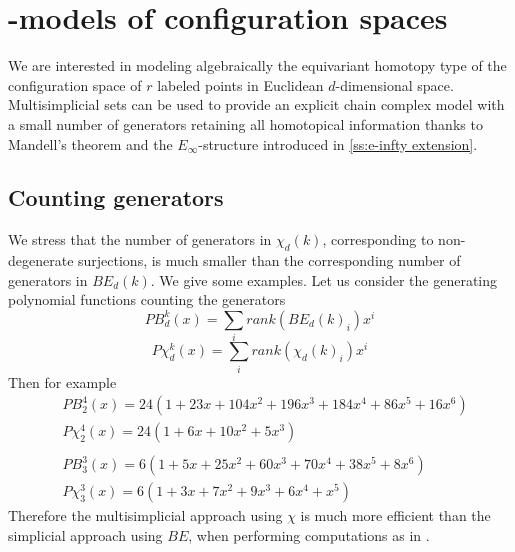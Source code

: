 
\section{\pdfEinfty-models of configuration spaces}

We are interested in modeling algebraically the equivariant homotopy type of the configuration space of $r$ labeled points in Euclidean $d$-dimensional space.
Multisimplicial sets can be used to provide an explicit chain complex model with a small number of generators retaining all homotopical information thanks to Mandell's theorem \cite{mandell2006homotopy_type} and the $E_\infty$-structure introduced in \cref{ss:e-infty extension}.





\subsection{Counting generators}

We stress that the number of generators in $\chi_d(k)$, corresponding to non-degenerate surjections, is much smaller than the corresponding number of generators in $BE_d(k)$.
We give some examples.
Let us consider the generating polynomial functions counting the generators
$$PB_d^k(x) = \sum_i rank(BE_d(k)_i) x^i $$ $$P\chi_d^k(x)=
\sum_i rank(\chi_d(k)_i) x^i$$
Then for example
\begin{align*}
	& PB_2^4(x)=24(1+23x+104x^2+196x^3+184x^4+86x^5+16x^6)\\
	& P\chi_2^4(x)=24(1+6x+10x^2+5x^3) \\
	& \\
	& PB_3^3(x) = 6(1+5x+25x^2+60x^3+70x^4+38x^5+8x^6 ) \\
	&  P\chi_3^3(x)= 6(1+3x+7x^2+9x^3+6x^4+x^5)
\end{align*}
Therefore the multisimplicial approach using $\chi$ is much more efficient than the simplicial
approach using $BE$, when performing computations as in \cite{formality}.

